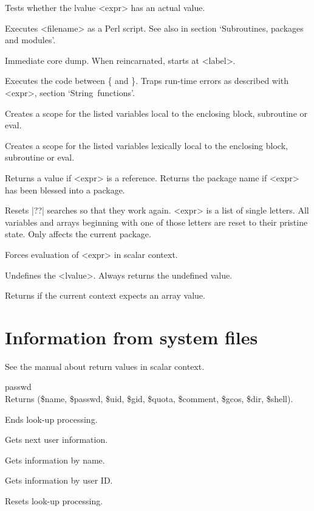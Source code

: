 \documentclass{refbase}
\begin{document}
\begin{enum}{1cm}

Tests whether the lvalue <expr> has an actual value.

Executes <filename> as a Perl script.
See also  in section `Subroutines, packages and modules'.

Immediate core dump. When reincarnated, starts at <label>.

Executes the code between \{ and \}. Traps run-time errors as described
with <expr>\kwd{)}, section `String~functions'.

Creates a scope for the listed variables local to the enclosing block,
subroutine or eval. 

Creates a scope for the listed variables lexically
local to the enclosing block, subroutine or eval. 

Returns a \true{} value if <expr> is a reference.
Returns the package name if <expr> has been blessed into a package.

Resets |??| searches so that they work again. <expr> is a list of
single letters. All variables and arrays beginning with one of those
letters are reset to their pristine state.  Only affects the current
package.

Forces evaluation of <expr> in scalar context.

Undefines the <lvalue>. Always returns the undefined value.

Returns \true{} if the current context expects an array value.

\end{enum}

\newpage

\section{Information from system files} 
See the manual about return values in scalar context.

{\largesl passwd} \\
Returns (\$name, \$passwd, \$uid, \$gid, \$quota, \$comment, \$gcos, \$dir, \$shell).

\begin{enum}{6cm}

Ends look-up processing.

Gets next user information.

Gets information by name. 

Gets information by user ID.

Resets look-up processing.

\end{enum}
\end{document}
